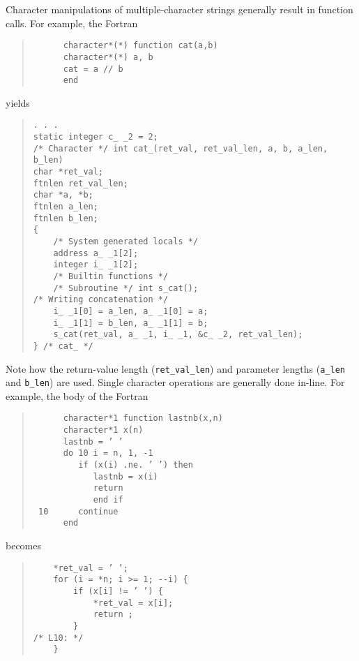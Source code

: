 \documentclass[10pt,a4paper]{article}
\begin{document}
Character manipulations of multiple-character strings generally result in function calls. For example, the Fortran
\begin{quote}
\begin{verbatim}
      character*(*) function cat(a,b)
      character*(*) a, b
      cat = a // b
      end
\end{verbatim}
\end{quote}
yields
\begin{quote}
\begin{verbatim}
. . .
static integer c_ _2 = 2;
/* Character */ int cat_(ret_val, ret_val_len, a, b, a_len, b_len)
char *ret_val;
ftnlen ret_val_len;
char *a, *b;
ftnlen a_len;
ftnlen b_len;
{
    /* System generated locals */
    address a_ _1[2];
    integer i_ _1[2];
    /* Builtin functions */
    /* Subroutine */ int s_cat();
/* Writing concatenation */
    i_ _1[0] = a_len, a_ _1[0] = a;
    i_ _1[1] = b_len, a_ _1[1] = b;
    s_cat(ret_val, a_ _1, i_ _1, &c_ _2, ret_val_len);
} /* cat_ */
\end{verbatim}
\end{quote}
Note how the return-value length (\verb|ret_val_len|) and parameter lengths (\verb|a_len| and \verb|b_len|) are used. Single character operations are generally done in-line. For example, the body of the Fortran
\begin{quote}
\begin{verbatim}
      character*1 function lastnb(x,n)
      character*1 x(n)
      lastnb = ’ ’
      do 10 i = n, 1, -1
         if (x(i) .ne. ’ ’) then
            lastnb = x(i)
            return
            end if
 10      continue
      end
\end{verbatim}
\end{quote}
becomes
\begin{quote}
\begin{verbatim}
    *ret_val = ’ ’;
    for (i = *n; i >= 1; --i) {
        if (x[i] != ’ ’) {
            *ret_val = x[i];
            return ;
        }
/* L10: */
    }
\end{verbatim}
\end{quote}
\end{document}
